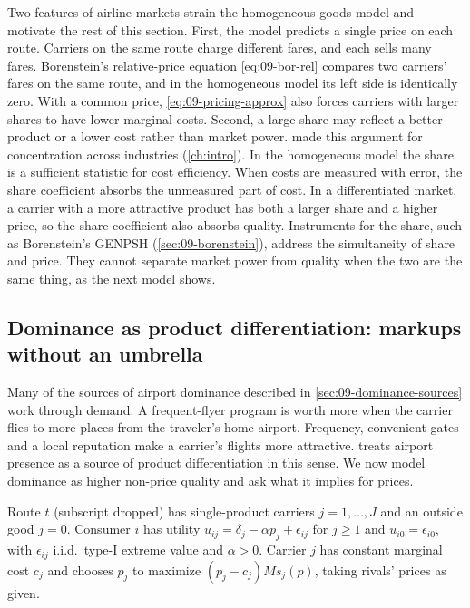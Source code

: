 Two features of airline markets strain the homogeneous-goods model and motivate the rest of this section.
First, the model predicts a single price on each route. Carriers on the same route charge different
fares, and each sells many fares. Borenstein's relative-price equation \eqref{eq:09-bor-rel} compares two
carriers' fares on the same route, and in the homogeneous model its left side is identically zero. With
a common price, \eqref{eq:09-pricing-approx} also forces carriers with larger shares to have lower
marginal costs. Second, a large share may reflect a better product or a lower cost rather than market
power. \citet{Demsetz1973} made this argument for concentration across industries (\cref{ch:intro}).
In the homogeneous model the share is a sufficient statistic for cost efficiency. When costs are measured
with error, the share coefficient absorbs the unmeasured part of cost. In a differentiated market, a
carrier with a more attractive product has both a larger share and a higher price, so the share
coefficient also absorbs quality. Instruments for the share, such as Borenstein's GENPSH
(\cref{sec:09-borenstein}), address the simultaneity of share and price. They cannot separate market
power from quality when the two are the same thing, as the next model shows.

\subsection{Dominance as product differentiation: markups without an umbrella}\label{sec:09-pricing-diff}

Many of the sources of airport dominance described in \cref{sec:09-dominance-sources} work through
demand.
A frequent-flyer program is worth more when the carrier flies to more places from the traveler's home
airport. Frequency, convenient gates and a local reputation make a carrier's flights more attractive.
\citet{Berry1990} treats airport presence as a source of product differentiation in this sense. We now model
dominance as higher non-price quality and ask what it implies for prices.

\begin{assumption}\label{ass:09-logit}
Route $t$ (subscript dropped) has single-product carriers $j=1,\dots,J$ and an outside good $j=0$.
Consumer $i$ has utility $u_{ij}=\delta_j-\alpha p_j+\epsilon_{ij}$ for $j\ge1$ and $u_{i0}=\epsilon_{i0}$,
with $\epsilon_{ij}$ i.i.d.\ type-I extreme value and $\alpha>0$. Carrier $j$ has constant marginal cost
$c_j$ and chooses $p_j$ to maximize $(p_j-c_j)Ms_j(p)$, taking rivals' prices as given.
\end{assumption}

